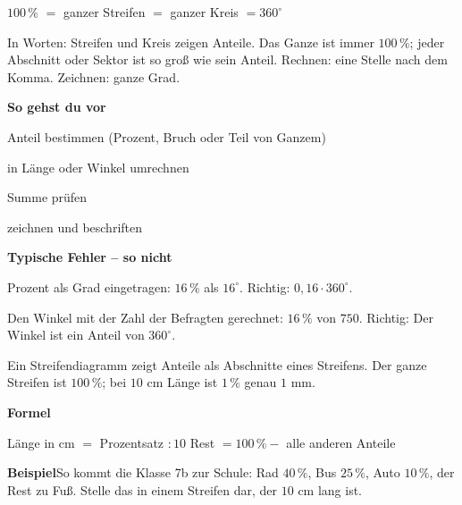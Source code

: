 \documentclass[11pt]{article}
\newcommand{\nr}[1]{\makebox[7mm][l]{\textbf{#1}}}
\begin{document}
\begin{tcolorbox}[colback=mbkasten,colframe=mbgrau,boxrule=0.5pt,arc=1mm,left=3mm,right=3mm,top=2mm,bottom=2mm,title={\bfseries Formel auf einen Blick},coltitle=black,colbacktitle=black!10]
{\Large $100\,\%$ $=$ ganzer Streifen $=$ ganzer Kreis $= 360^\circ$}\par\medskip
In Worten: Streifen und Kreis zeigen Anteile. Das Ganze ist immer $100\,\%$; jeder Abschnitt oder Sektor ist so groß wie sein Anteil. Rechnen: eine Stelle nach dem Komma. Zeichnen: ganze Grad.\par\medskip
\textbf{So gehst du vor}\par
\nr{1}Anteil bestimmen (Prozent, Bruch oder Teil von Ganzem)\par
\nr{2}in Länge oder Winkel umrechnen\par
\nr{3}Summe prüfen\par
\nr{4}zeichnen und beschriften\par
\medskip
\end{tcolorbox}
\medskip\noindent\textbf{Typische Fehler – so nicht}\par\smallskip
\noindent\nr{$\times$}Prozent als Grad eingetragen: $16\,\%$ als $16^\circ$. Richtig: $0{,}16 \cdot 360^\circ$.\par
\noindent\nr{$\times$}Den Winkel mit der Zahl der Befragten gerechnet: $16\,\%$ von $750$. Richtig: Der Winkel ist ein Anteil von $360^\circ$.\par
\clearpage\label{s:A}\noindent\colorbox{black!12}{}\hspace{3mm}{\Large\bfseries Streifendiagramm zeichnen}\par\smallskip
\noindent Ein Streifendiagramm zeigt Anteile als Abschnitte eines Streifens. Der ganze Streifen ist $100\,\%$; bei $10$ cm Länge ist $1\,\%$ genau $1$ mm.\par\medskip
\noindent\textbf{Formel}\par\nopagebreak\noindent\hspace*{4mm}\begin{minipage}{\dimexpr\linewidth-4mm\relax}Länge in cm $=$ Prozentsatz $: 10$ \qquad Rest $= 100\,\% -$ alle anderen Anteile\end{minipage}\par\medskip
\noindent\textbf{Beispiel}\quad So kommt die Klasse 7b zur Schule: Rad $40\,\%$, Bus $25\,\%$, Auto $10\,\%$, der Rest zu Fuß. Stelle das in einem Streifen dar, der $10$ cm lang ist.\par\smallskip
\end{document}
